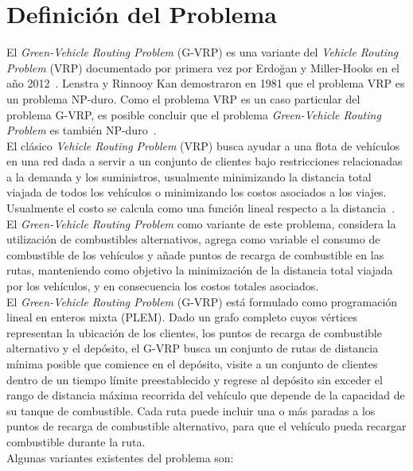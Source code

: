 \documentclass[letter, 10pt]{article}
\begin{document}
\section{Definici\'on del Problema}

 El \textit{Green-Vehicle Routing Problem} (G-VRP) es una variante del \textit{Vehicle Routing Problem} (VRP) documentado por primera vez por Erdoğan y Miller-Hooks en el año 2012~\cite{erdogan_green_2012}. Lenstra y Rinnooy Kan demostraron en 1981 que el problema VRP es un problema NP-duro. Como el problema VRP es un caso particular del problema G-VRP, es posible concluir que el problema \textit{Green-Vehicle Routing Problem} es también NP-duro~\cite{montoya_multi-space_2016}.
 \\El clásico \textit{Vehicle Routing Problem} (VRP) busca ayudar a una flota de vehículos en una red dada a servir a un conjunto de clientes bajo restricciones relacionadas a la demanda y los suministros, usualmente minimizando la distancia total viajada de todos los vehículos o minimizando los costos asociados a los viajes. Usualmente el costo se calcula como una función lineal respecto a la distancia~\cite{koc_green_2016}. El \textit{Green-Vehicle Routing Problem} como variante de este problema, considera la utilización de combustibles alternativos, agrega como variable el consumo de combustible de los vehículos y añade puntos de recarga de combustible en las rutas, manteniendo como objetivo la minimización de la distancia total viajada por los vehículos, y en consecuencia los costos totales asociados.~\cite{erdogan_green_2012}
 \\El \textit{Green-Vehicle Routing Problem} (G-VRP) está formulado como programación lineal en enteros mixta (PLEM). Dado un grafo completo cuyos vértices representan la ubicación de los clientes, los puntos de recarga de combustible alternativo y el depósito, el G-VRP busca un conjunto de rutas de distancia mínima posible que comience en el depósito, visite a un conjunto de clientes dentro de un tiempo límite preestablecido y regrese al depósito sin exceder el rango de distancia máxima recorrida del vehículo que depende de la capacidad de su tanque de combustible. Cada ruta puede incluir una o más paradas a los puntos de recarga de combustible alternativo, para que el vehículo pueda recargar combustible durante la ruta.~\cite{erdogan_green_2012}
 \\Algunas variantes existentes del problema son:
\end{document}
